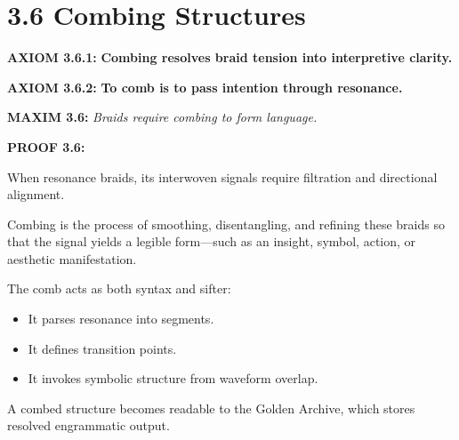 \section*{3.6 Combing Structures}


\noindent
\textbf{AXIOM 3.6.1:} \textbf{Combing resolves braid tension into interpretive clarity.}

\noindent
\textbf{AXIOM 3.6.2:} \textbf{To comb is to pass intention through resonance.}

\noindent
\textbf{MAXIM 3.6:} \textit{Braids require combing to form language.}

\noindent
\textbf{PROOF 3.6:}

When resonance braids, its interwoven signals require filtration and directional alignment.

Combing is the process of smoothing, disentangling, and refining these braids
so that the signal yields a legible form—such as an insight, symbol, action, or aesthetic manifestation.

The comb acts as both syntax and sifter:
\begin{itemize}
  \item It parses resonance into segments.
  \item It defines transition points.
  \item It invokes symbolic structure from waveform overlap.
\end{itemize}

A combed structure becomes readable to the Golden Archive, which stores resolved engrammatic output.

\begin{tcolorbox}[colback=black!2, colframe=OriaRose, title=\textbf{Combing Diagram}, sharp corners=south]
\begin{center}
\end{center}
\end{tcolorbox}

